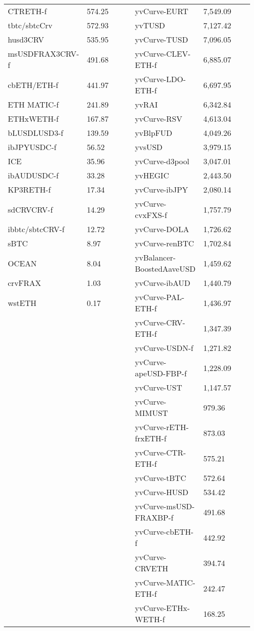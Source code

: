 \begin{longtable}{@{}p{0.25\linewidth}p{0.25\linewidth}p{0.25\linewidth}p{0.25\linewidth}@{}}
CTRETH-f & 574.25 & yvCurve-EURT & 7,549.09 \\
tbtc/sbtcCrv & 572.93 & yvTUSD & 7,127.42 \\
husd3CRV & 535.95 & yvCurve-TUSD & 7,096.05 \\
msUSDFRAX3CRV-f & 491.68 & yvCurve-CLEV-ETH-f & 6,885.07 \\
cbETH/ETH-f & 441.97 & yvCurve-LDO-ETH-f & 6,697.95 \\
ETH MATIC-f & 241.89 & yvRAI & 6,342.84 \\
ETHxWETH-f & 167.87 & yvCurve-RSV & 4,613.04 \\
bLUSDLUSD3-f & 139.59 & yvBlpFUD & 4,049.26 \\
ibJPYUSDC-f & 56.52 & yvsUSD & 3,979.15 \\
ICE & 35.96 & yvCurve-d3pool & 3,047.01 \\
ibAUDUSDC-f & 33.28 & yvHEGIC & 2,443.50 \\
KP3RETH-f & 17.34 & yvCurve-ibJPY & 2,080.14 \\
sdCRVCRV-f & 14.29 & yvCurve-cvxFXS-f & 1,757.79 \\
ibbtc/sbtcCRV-f & 12.72 & yvCurve-DOLA & 1,726.62 \\
sBTC & 8.97 & yvCurve-renBTC & 1,702.84 \\
OCEAN & 8.04 & yvBalancer-BoostedAaveUSD & 1,459.62 \\
crvFRAX & 1.03 & yvCurve-ibAUD & 1,440.79 \\
wstETH & 0.17 & yvCurve-PAL-ETH-f & 1,436.97 \\
 &  & yvCurve-CRV-ETH-f & 1,347.39 \\
 &  & yvCurve-USDN-f & 1,271.82 \\
 &  & yvCurve-apeUSD-FBP-f & 1,228.09 \\
 &  & yvCurve-UST & 1,147.57 \\
 &  & yvCurve-MIMUST & 979.36 \\
 &  & yvCurve-rETH-frxETH-f & 873.03 \\
 &  & yvCurve-CTR-ETH-f & 575.21 \\
 &  & yvCurve-tBTC & 572.64 \\
 &  & yvCurve-HUSD & 534.42 \\
 &  & yvCurve-msUSD-FRAXBP-f & 491.68 \\
 &  & yvCurve-cbETH-f & 442.92 \\
 &  & yvCurve-CRVETH & 394.74 \\
 &  & yvCurve-MATIC-ETH-f & 242.47 \\
 &  & yvCurve-ETHx-WETH-f & 168.25 \\

\end{longtable}
